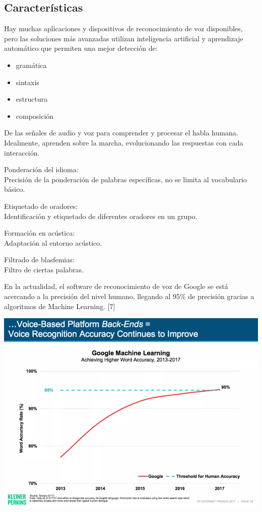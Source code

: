 \documentclass[twocolumn]{article}
\begin{document}
\subsection{Características}

Hay muchas aplicaciones y dispositivos de reconocimiento de voz disponibles, pero las soluciones más avanzadas utilizan inteligencia artificial y aprendizaje automático que permiten una mejor detección de:

\begin{itemize}
  \item gramática
  \item sintaxis
  \item estructura
  \item composición
\end{itemize}

De las señales de audio y voz para comprender y procesar el habla humana. Idealmente, aprenden sobre la marcha, evolucionando las respuestas con cada interacción.

\begin{description}
  \item Ponderación del idioma: \\
        Precisión de la ponderación de palabras específicas, no se limita al vocabulario básico.
  \item Etiquetado de oradores: \\
        Identificación y etiquetado de diferentes oradores en un grupo.
  \item Formación en acústica: \\
        Adaptación al entorno acústico.
  \item Filtrado de blasfemias: \\
        Filtro de ciertas palabras.
\end{description}

En la actualidad, el software de reconocimiento de voz de Google se está acercando a la precisión del nivel humano, llegando al 95\% de precisión gracias a algoritmos de Machine Learning. [7]

\includegraphics[width=1.02\linewidth]{img/aagyw-j4rrq.jpg}
\end{document}
